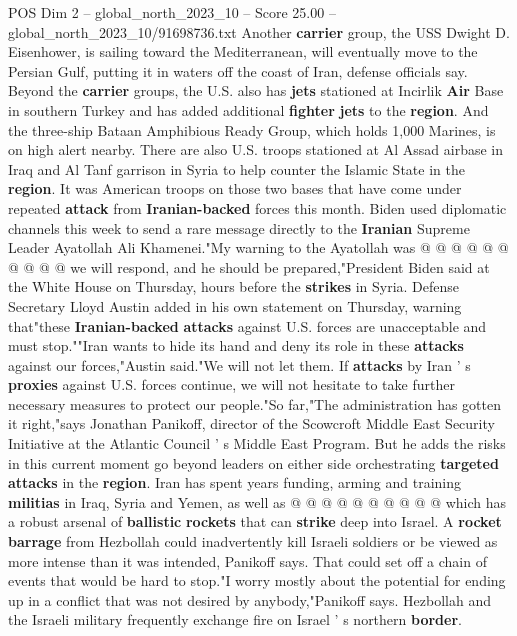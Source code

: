 \begin{textsample}{POS Dim 2 – global\_north\_2023\_10 – Score 25.00 – global\_north\_2023\_10/91698736.txt}
Another \textbf{carrier} group, the USS Dwight D.
Eisenhower, is sailing toward the Mediterranean, will eventually move to the Persian Gulf, putting it in waters off the coast of Iran, defense officials say.
Beyond the \textbf{carrier} groups, the U.S. also has \textbf{jets} stationed at Incirlik \textbf{Air} Base in southern Turkey and has added additional \textbf{fighter} \textbf{jets} to the \textbf{region}.
And the three-ship Bataan Amphibious Ready Group, which holds 1,000 Marines, is on high alert nearby.
There are also U.S. troops stationed at Al Assad airbase in Iraq and Al Tanf garrison in Syria to help counter the Islamic State in the \textbf{region}.
It was American troops on those two bases that have come under repeated \textbf{attack} from \textbf{Iranian-backed} forces this month.
Biden used diplomatic channels this week to send a rare message directly to the \textbf{Iranian} Supreme Leader Ayatollah Ali Khamenei."My warning to the Ayatollah was @ @ @ @ @ @ @ @ @ @ we will respond, and he should be prepared,"President Biden said at the White House on Thursday, hours before the \textbf{strikes} in Syria.
Defense Secretary Lloyd Austin added in his own statement on Thursday, warning that"these \textbf{Iranian-backed} \textbf{attacks} against U.S. forces are unacceptable and must stop.""Iran wants to hide its hand and deny its role in these \textbf{attacks} against our forces,"Austin said."We will not let them.
If \textbf{attacks} by Iran ' s \textbf{proxies} against U.S. forces continue, we will not hesitate to take further necessary measures to protect our people."So far,"The administration has gotten it right,"says Jonathan Panikoff, director of the Scowcroft Middle East Security Initiative at the Atlantic Council ' s Middle East Program.
But he adds the risks in this current moment go beyond leaders on either side orchestrating \textbf{targeted} \textbf{attacks} in the \textbf{region}.
Iran has spent years funding, arming and training \textbf{militias} in Iraq, Syria and Yemen, as well as @ @ @ @ @ @ @ @ @ @ which has a robust arsenal of \textbf{ballistic} \textbf{rockets} that can \textbf{strike} deep into Israel.
A \textbf{rocket} \textbf{barrage} from Hezbollah could inadvertently kill Israeli soldiers or be viewed as more intense than it was intended, Panikoff says.
That could set off a chain of events that would be hard to stop."I worry mostly about the potential for ending up in a conflict that was not desired by anybody,"Panikoff says.
Hezbollah and the Israeli military frequently exchange fire on Israel ' s northern \textbf{border}.

\end{textsample}
